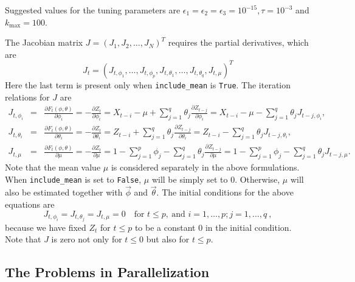 \documentclass[english,12pt]{article}
\begin{document}
\begin{algorithm}[ht]
\label{alg:LM}
\end{algorithm}

Suggested values for the tuning parameters are $\epsilon_1 = \epsilon_2 =
\epsilon_3 = 10^{-15}, \tau = 10^{-3}$ and $k_{\max} = 100$.

The Jacobian matrix $J = {(J_{1}, J_{2}, \ldots, J_N)}^T$ requires the partial derivatives, which are
\begin{equation}
J_t = {(J_{t, \phi_1}, \ldots, J_{t,\phi_p}, J_{t,\theta_1}, \ldots,
  J_{t,\theta_q}, J_{t,\mu})}^T
\end{equation}
Here the last term is present only when \texttt{include\_mean} is
\texttt{True}.
The iteration relations for $J$ are
\begin{eqnarray}
J_{t, \phi_i} &=& \frac{\partial F_t(\phi,\theta)}{\partial \phi_i} =
-\frac{\partial Z_t}{\partial \phi_i} = X_{t-i}-\mu + \sum_{j=1}^q
\theta_j \frac{\partial Z_{t - j}}{\partial \phi_i} = X_{t-i}-\mu - \sum_{j=1}^q
\theta_j J_{t-j,\phi_i}, \label{eq:J1}\\
J_{t, \theta_i}&=&\frac{\partial F_t(\phi,\theta)}{\partial \theta_i} =
-\frac{\partial Z_t}{\partial \theta_i} = Z_{t-i} + \sum_{j =1}^q
\theta_j \frac{\partial Z_{t - j}}{\partial \theta_i} = Z_{t-i} -
\sum_{j=1}^q \theta_j J_{t-j,\theta_i}, \label{eq:J2}\\
J_{t, \mu} &=&\frac{\partial F_t(\phi,\theta)}{\partial \mu} =
-\frac{\partial Z_t}{\partial \mu} = 1 -
\sum_{j=1}^p \phi_j - \sum_{j=1}^q \theta_j \frac{\partial
  Z_{t-j}}{\partial \mu} = 1 - \sum_{j=1}^p \phi_j - \sum_{j=1}^q
\theta_j J_{t-j,\mu}. \label{eq:J3}
\end{eqnarray}
Note that the mean value $\mu$ is considered separately in the above
formulations. When \texttt{include\_mean} is set to \texttt{False}, $\mu$ will be simply
set to 0. Otherwise, $\mu$ will also be estimated together with
$\vec{\phi}$ and $\vec{\theta}$. The initial conditions for the above
equations are
\begin{equation}
J_{t,\phi_i} = J_{t,\theta_j} = J_{t,\mu} = 0 \quad \mbox{for }
t \leq p,\ \mbox{and }i=1,\dots,p; j = 1, \dots, q\ ,
\end{equation}
because we have fixed $Z_t$ for $t\leq p$ to be a constant $0$ in the initial
condition. Note that $J$ is zero not only for $t\leq
0$ but also for $t\leq p$.

\subsection{The Problems in Parallelization}
\end{document}
